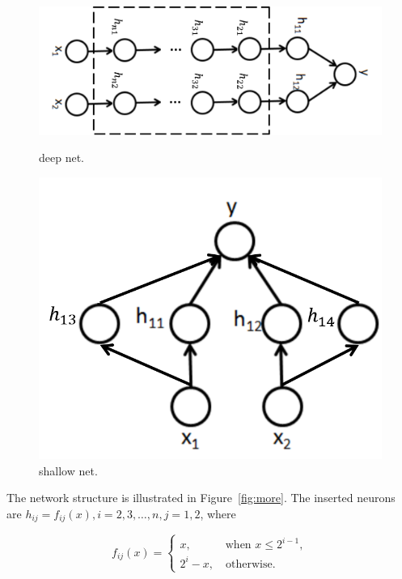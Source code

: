 \begin{figure}[ht]
\begin{minipage}[b]{0.6\linewidth}
\centering
    \includegraphics[width=0.9\linewidth]{fig/more.png}
    \caption{\small
    deep net.}
    \label{fig:more}
\end{minipage}
\hspace{0.5cm}
\begin{minipage}[b]{0.35\linewidth}
\centering
    \includegraphics[width=0.9\linewidth]{fig/one.png}
    \caption{\small
    shallow net.}
    \label{fig:one}
\end{minipage}
\end{figure}


The network structure is illustrated in Figure~\ref{fig:more}.
The inserted neurons are $h_{ij}=f_{ij}(x), i=2,3,\dots,n, j=1,2$,
where

\begin{equation}
    f_{ij}(x) = \begin{cases}
            x, \quad\quad\quad \text{when }x\le 2^{i-1}, \\
            2^i-x, \quad \text{otherwise}.
        \end{cases}
\end{equation}

